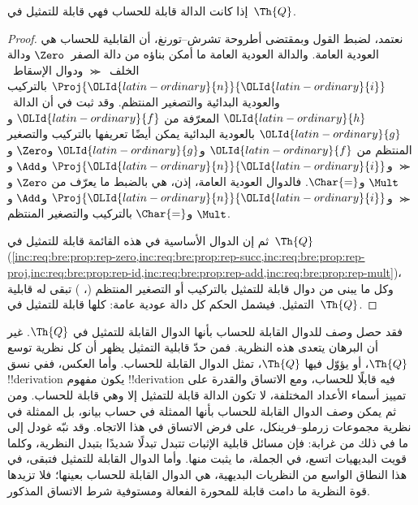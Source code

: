 \documentclass[../../../include/open-logic-section]{subfiles}
\begin{document}

\begin{thm}
إذا كانت الدالة قابلة للحساب فهي قابلة للتمثيل في~$\Th{Q}$.
\end{thm}

\begin{proof}
نعتمد، لضبط القول وبمقتضى أطروحة تشرش--تورنغ، أن القابلية للحساب
هي العودية العامة. والدالة العودية العامة ما أمكن بناؤه من دالة
الصفر~$\Zero$ ودالة الخلف~$\Succ$ ودوال الإسقاط~$\Proj{{\OLId{latin-ordinary}{n}}}{{\OLId{latin-ordinary}{i}}}$
بالتركيب والعودية البدائية والتصغير المنتظم.
وقد ثبت في  أن الدالة~${\OLId{latin-ordinary}{h}}$
المعرّفة من ${\OLId{latin-ordinary}{f}}$ و${\OLId{latin-ordinary}{g}}$ بالعودية البدائية يمكن أيضًا تعريفها بالتركيب
والتصغير المنتظم من ${\OLId{latin-ordinary}{f}}$ و${\OLId{latin-ordinary}{g}}$ و$\Zero$ و$\Succ$ و$\Proj{{\OLId{latin-ordinary}{n}}}{{\OLId{latin-ordinary}{i}}}$
و$\Add$ و$\Mult$ و$\Char{=}$.
فالدوال العودية العامة، إذن، هي بالضبط ما يعرّف من
$\Zero$ و$\Succ$ و$\Proj{{\OLId{latin-ordinary}{n}}}{{\OLId{latin-ordinary}{i}}}$ و$\Add$ و$\Mult$ و$\Char{=}$
بالتركيب والتصغير المنتظم.

ثم إن الدوال الأساسية في هذه القائمة قابلة للتمثيل في~$\Th{Q}$
(\cref{inc:req:bre:prop:rep-zero,inc:req:bre:prop:rep-succ,inc:req:bre:prop:rep-proj,inc:req:bre:prop:rep-id,inc:req:bre:prop:rep-add,inc:req:bre:prop:rep-mult})،
وكل ما يبنى من دوال قابلة للتمثيل بالتركيب أو التصغير المنتظم
(،
) تبقى له قابلية التمثيل.
فيشمل الحكم كل دالة عودية عامة: كلها قابلة للتمثيل في~$\Th{Q}$.
\end{proof}

\begin{explain}
فقد حصل وصف للدوال القابلة للحساب بأنها الدوال القابلة للتمثيل في
$\Th{Q}$. غير أن البرهان يتعدى هذه النظرية. فمن حدّ قابلية التمثيل
يظهر أن كل نظرية توسع $\Th{Q}$، أو يؤوّل فيها $\Th{Q}$، تمثل
الدوال القابلة للحساب.
وأما العكس، ففي نسق !!{derivation} يكون مفهوم !!{derivation} فيه
قابلًا للحساب، ومع الاتساق والقدرة على تمييز أسماء الأعداد المختلفة،
لا تكون الدالة قابلة للتمثيل إلا وهي قابلة للحساب.
ومن ثم يمكن وصف الدوال القابلة للحساب بأنها الممثلة في حساب بيانو،
بل الممثلة في نظرية مجموعات زرملو--فرينكل، على فرض الاتساق في هذا الاتجاه.
وقد نبّه غودل إلى ما في ذلك من غرابة: فإن مسائل قابلية الإثبات تتبدل
تبدلًا شديدًا بتبدل النظرية، وكلما قويت البديهيات اتسع، في الجملة، ما
يثبت منها. وأما الدوال القابلة للتمثيل فتبقى، في هذا النطاق الواسع من
النظريات البديهية، هي الدوال القابلة للحساب بعينها؛ فلا تزيدها قوة النظرية
ما دامت قابلة للمحورة الفعالة ومستوفية شرط الاتساق المذكور.
\end{explain}
\end{document}
